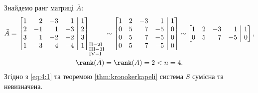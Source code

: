 Знайдемо ранг матриці \(\bar{A}\):
\begin{gather}
	\bar{A}=\left[\begin{array}{@{}rrrr|r@{}}
		1&2&-3&1&1\\
		2&-1&1&-3&2\\
		3&1&-2&-2&3\\
		1&-3&4&-4&1
	\end{array}\right]_{\substack{\mathrm{II-2I}\hfill\\\mathrm{III-3I}\hfill\\\mathrm{IV-I}\hfill}}\sim\left[\begin{array}{@{}rrrr|r@{}}
	1&2&-3&1&1\\
	0&5&7&-5&0\\
	0&5&7&-5&0\\
	0&5&7&-5&0
\end{array}\right]\sim\left[\begin{array}{@{}rrrr|r@{}}
1&2&-3&1&1\\
0&5&7&-5&0
\end{array}\right],\\
\rank(\bar{A})=\rank(A)=2<n=4.\label{eq:4:1}
\end{gather}
Згідно з \eqref{eq:4:1} та теоремою \ref{thm:kronokerkapeli} система \(S\) сумісна та невизначена.

